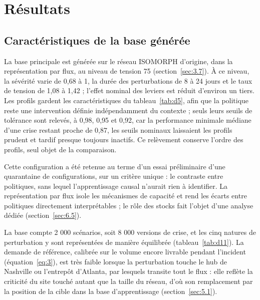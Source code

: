 
\section{Résultats}
\label{sec:6}

\subsection{Caractéristiques de la base générée}
\label{sec:6.1}

La base principale est générée sur le réseau ISOMORPH d'origine, dans la représentation par flux, au niveau de tension 75 (section~\ref{sec:3.7}). À ce niveau, la sévérité varie de 0,68 à 1, la durée des perturbations de 8 à 24 jours et le taux de tension de 1,08 à 1,42 ; l'effet nominal des leviers est réduit d'environ un tiers. Les profils gardent les caractéristiques du tableau~\ref{tab:d5}, afin que la politique reste une intervention définie indépendamment du contexte ; seuls leurs seuils de tolérance sont relevés, à 0,98, 0,95 et 0,92, car la performance minimale médiane d'une crise restant proche de 0,87, les seuils nominaux laissaient les profils prudent et tardif presque toujours inactifs. Ce relèvement conserve l'ordre des profils, seul objet de la comparaison.

Cette configuration a été retenue au terme d'un essai préliminaire d'une quarantaine de configurations, sur un critère unique : le contraste entre politiques, sans lequel l'apprentissage causal n'aurait rien à identifier. La représentation par flux isole les mécanismes de capacité et rend les écarts entre politiques directement interprétables ; le rôle des stocks fait l'objet d'une analyse dédiée (section~\ref{sec:6.5}).

La base compte 2 000 scénarios, soit 8 000 versions de crise, et les cinq natures de perturbation y sont représentées de manière équilibrée (tableau~\ref{tab:d11}). La demande de référence, calibrée sur le volume encore livrable pendant l'incident (équation~\eqref{eq:3}), est très faible lorsque la perturbation touche le hub de Nashville ou l'entrepôt d'Atlanta, par lesquels transite tout le flux : elle reflète la criticité du site touché autant que la taille du réseau, d'où son remplacement par la position de la cible dans la base d'apprentissage (section~\ref{sec:5.1}).

